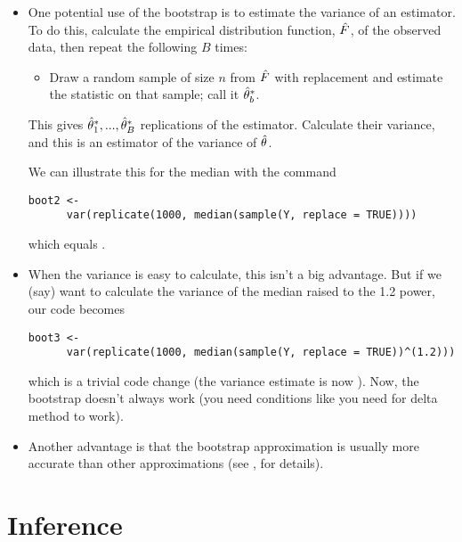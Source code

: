 \begin{itemize}[leftmargin=0pt]

\item One potential use of the bootstrap is to estimate the variance
  of an estimator.  To do this, calculate the empirical distribution
  function, $\hat{F}$, of the observed data, then repeat the following $B$
  times:
  \begin{itemize}
  \item Draw a random sample of size $n$ from $\hat{F}$ with replacement
    and estimate the statistic on that sample; call it $\hat{\theta}^*_b$.
  \end{itemize}
  This gives $\hat{\theta}^*_1,...,\hat{\theta}^*_B$ replications of the estimator.
  Calculate their variance, and this is an estimator of the variance
  of $\hat{\theta}$.

  We can illustrate this for the median with the command
  \begin{lstlisting}[firstline=2,gobble=6]
    boot2 <-
      var(replicate(1000, median(sample(Y, replace = TRUE))))
  \end{lstlisting}
  which equals \medv.

\item When the variance is easy to calculate, this isn't a big
  advantage.  But if we (say) want to calculate the variance of the
  median raised to the 1.2 power, our code becomes
  \begin{lstlisting}[firstline=2,gobble=6]
    boot3 <-
      var(replicate(1000, median(sample(Y, replace = TRUE))^(1.2)))
  \end{lstlisting}
  which is a trivial code change (the variance estimate is now \powv).
  Now, the bootstrap doesn't always work (you need conditions like you
  need for delta method to work).

\item Another advantage is that the bootstrap approximation is usually
  more accurate than other approximations (see \citealp{Hal91}, for
  details).

\end{itemize}

\section{Inference}

